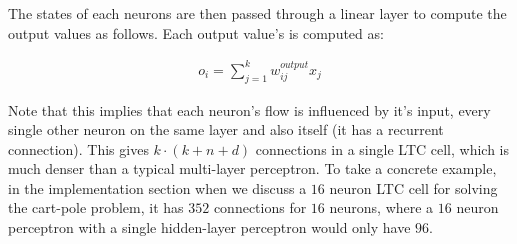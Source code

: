 The states of each neurons are then passed through a linear layer to compute the output values as follows. Each output value's is computed as:

\begin{align*}
    o_i =  \sum_{j=1}^{k} w_{ij}^\textit{output} x_j 
\end{align*}

Note that this implies that each neuron's flow is influenced by it's input, every single other neuron on the same layer and also itself (it has a recurrent connection). This gives $k\cdot(k+n+d)$ connections in a single LTC cell, which is much denser than a typical multi-layer perceptron. To take a concrete example, in the implementation section when we discuss a $16$ neuron LTC cell for solving the cart-pole problem, it has $352$ connections for $16$ neurons, where a $16$ neuron perceptron with a single hidden-layer perceptron would only have $96$.
